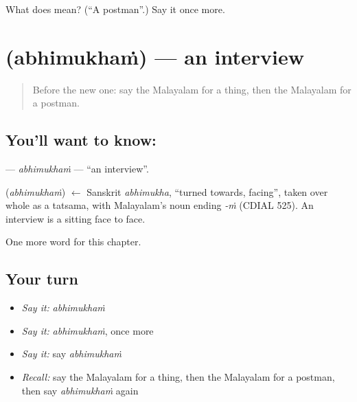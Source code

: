 \begin{tcolorbox}[breakable,colback=teal!4,colframe=teal!35!black,title={Before you move on}]
What does  mean? (\textquotedblleft{}A postman\textquotedblright{}.) Say it once more.
\end{tcolorbox}
\section[\texorpdfstring{\ml{അഭിമുഖം} (abhimukhaṁ)}{അഭിമുഖം (abhimukhaṁ)}]{ (abhimukhaṁ) — an interview}

\label{lesson:ML-C261-abhimukham}



\begin{quote}
Before the new one: say the Malayalam for a thing, then the Malayalam for a postman.
\end{quote}

\subsection*{You'll want to know: }
\textbf{} — \emph{abhimukhaṁ} — \textquotedblleft{}an interview\textquotedblright{}.

\begin{cousinweb}
\textbf{} (\emph{abhimukhaṁ}) $\leftarrow$ Sanskrit \emph{abhimukha}, \textquotedblleft{}turned towards, facing\textquotedblright{}, taken over whole as a tatsama, with Malayalam's noun ending \emph{-ṁ} (CDIAL 525). An interview is a sitting face to face.
\end{cousinweb}

\begin{grammarlens}[title={What you've built}]
One more word for this chapter.
\end{grammarlens}

\subsection*{Your turn}
\begin{itemize}
\raggedright
  \item \emph{Say it:} \emph{abhimukhaṁ}
  \item \emph{Say it:} \emph{abhimukhaṁ}, once more
  \item \emph{Say it:} say \emph{abhimukhaṁ}
  \item \emph{Recall:} say the Malayalam for a thing, then the Malayalam for a postman, then say \emph{abhimukhaṁ} again
\end{itemize}

